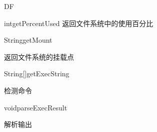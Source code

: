 \begin{XeClass}{DF}
\begin{XeMethod}{\XePublic}{int}{getPercentUsed}
 返回文件系统中的使用百分比

    \end{XeMethod}

    \begin{XeMethod}{\XePublic}{String}{getMount}
         
 返回文件系统的挂载点

    \end{XeMethod}

    \begin{XeMethod}{\XeProtected}{String[]}{getExecString}
         
 检测命令

    \end{XeMethod}

    \begin{XeMethod}{\XeProtected}{void}{parseExecResult}
         
 解析输出

    \end{XeMethod}

\end{XeClass}
